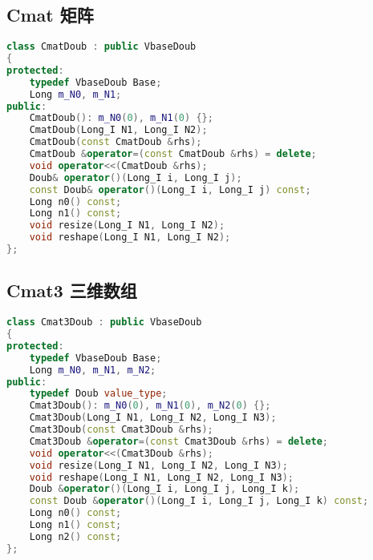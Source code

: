 \subsection{Cmat 矩阵}
\begin{lstlisting}[language=cpp]
class CmatDoub : public VbaseDoub
{
protected:
    typedef VbaseDoub Base;
    Long m_N0, m_N1;
public:
    CmatDoub(): m_N0(0), m_N1(0) {};
    CmatDoub(Long_I N1, Long_I N2);
    CmatDoub(const CmatDoub &rhs);
    CmatDoub &operator=(const CmatDoub &rhs) = delete;
    void operator<<(CmatDoub &rhs);
    Doub& operator()(Long_I i, Long_I j);
    const Doub& operator()(Long_I i, Long_I j) const;
    Long n0() const;
    Long n1() const;
    void resize(Long_I N1, Long_I N2);
    void reshape(Long_I N1, Long_I N2);
};
\end{lstlisting}

\subsection{Cmat3 三维数组}
\begin{lstlisting}[language=cpp]
class Cmat3Doub : public VbaseDoub
{
protected:
    typedef VbaseDoub Base;
    Long m_N0, m_N1, m_N2;
public:
    typedef Doub value_type;
    Cmat3Doub(): m_N0(0), m_N1(0), m_N2(0) {};
    Cmat3Doub(Long_I N1, Long_I N2, Long_I N3);
    Cmat3Doub(const Cmat3Doub &rhs);
    Cmat3Doub &operator=(const Cmat3Doub &rhs) = delete;
    void operator<<(Cmat3Doub &rhs);
    void resize(Long_I N1, Long_I N2, Long_I N3);
    void reshape(Long_I N1, Long_I N2, Long_I N3);
    Doub &operator()(Long_I i, Long_I j, Long_I k);
    const Doub &operator()(Long_I i, Long_I j, Long_I k) const;
    Long n0() const;
    Long n1() const;
    Long n2() const;
};
\end{lstlisting}

